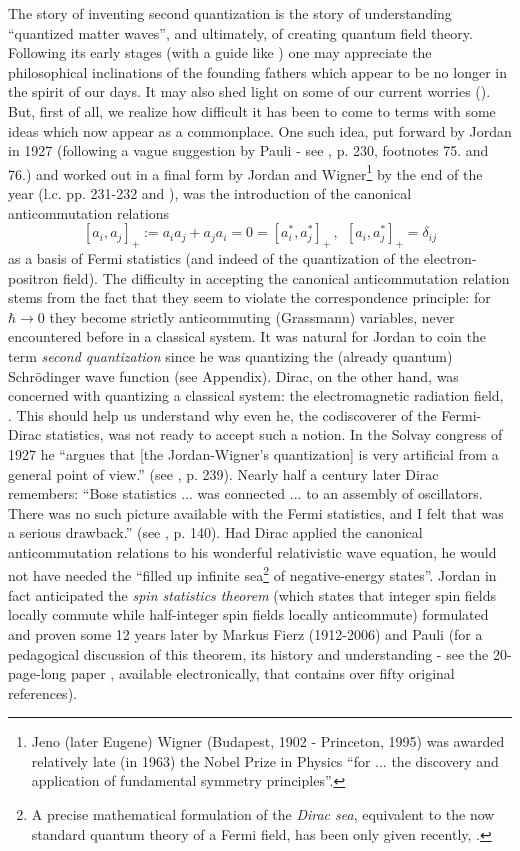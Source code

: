 The story of inventing second quantization is the story of understanding 
``quantized matter waves'', and ultimately, of creating quantum field theory. 
Following its early stages (with a guide like \cite{Dar}) one may appreciate 
the philosophical inclinations of the founding fathers which appear to be no 
longer in the spirit of our days. It may also shed light on some of our current
 worries (\cite{S10}). But, first of all, we realize how difficult it has been 
to come to terms with some ideas which now appear as a commonplace. One such
idea, put forward by Jordan in 1927 (following a vague suggestion by Pauli - see
 \cite{Dar}, p. 230, footnotes 75. and 76.) and worked out in a final form by 
Jordan and Wigner\footnote{Jeno (later Eugene) Wigner (Budapest, 1902 - 
Princeton, 1995) was awarded relatively late (in 1963) the Nobel Prize in 
Physics ``for ... the discovery and application of fundamental symmetry 
principles''.} by the end of the year (l.c. pp. 231-232 and \cite{JW28}), was 
the introduction of the canonical anticommutation relations
\begin{equation}
\label{CAR}
[a_i, a_j]_+:= a_i a_j + a_j a_i=0 = [a_i^*, a_j^*]_+\,, \ \ [a_i, a_j^*]_+ = 
\delta_{ij}
\end{equation}
as a basis of Fermi statistics (and indeed of the quantization of the electron-positron field). The difficulty in accepting the canonical anticommutation relation stems from the fact that they seem to violate the correspondence principle: for $\hbar \rightarrow 0$ they become strictly anticommuting (Grassmann) variables, never encountered 
before in a classical system.  It was natural for Jordan to coin the term {\it second quantization} since he was quantizing the (already quantum) Schr\"odinger wave 
function (see Appendix). Dirac, on the other hand, was concerned with quantizing a classical system: the electromagnetic radiation field, \cite{D27}. This should help us understand why even he, the codiscoverer of the Fermi-Dirac statistics, was not ready to accept such a notion. In the Solvay congress of 1927 he ``argues  that [the Jordan-Wigner's quantization] is very artificial from a general point of view.'' (see \cite{Dar}, p. 239). Nearly half a century later Dirac remembers: ``Bose statistics ... was connected ... to an assembly of oscillators. There was no such picture available with the Fermi statistics, and I felt that was a serious drawback.'' 
(see \cite{D}, p. 140). Had Dirac applied the canonical anticommutation 
relations to his wonderful relativistic wave equation, he would not have needed
 the ``filled up infinite sea\footnote{A precise mathematical formulation of the
 {\it Dirac sea}, equivalent to the now standard quantum theory of a Fermi 
field, has been only given recently, \cite{D11}.} of negative-energy states''. 
Jordan in fact anticipated the {\it spin statistics theorem} (which states that
 integer spin fields locally commute while half-integer spin fields locally 
anticommute) formulated and proven some 12 years later by Markus Fierz 
(1912-2006) and Pauli (for a pedagogical discussion of this theorem, its history
 and understanding - see the 20-page-long paper \cite{DS}, available 
electronically, that contains over fifty original references).

